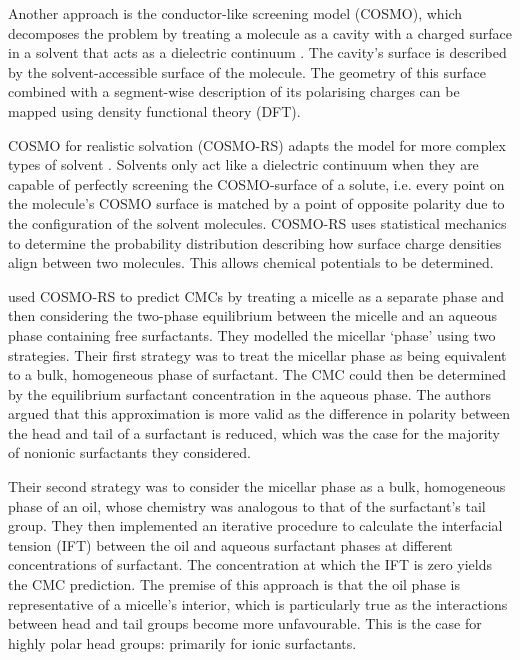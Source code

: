 Another approach is the conductor-like screening model (COSMO), which decomposes
the problem by treating a molecule as a cavity with a charged surface in a
solvent that acts as a dielectric continuum \cite{klamtCOSMONewApproach1993}.
The cavity's surface is described by the solvent-accessible surface of the
molecule. The geometry of this surface combined with a segment-wise description
of its polarising charges can be mapped using density functional theory (DFT).

COSMO for realistic solvation (COSMO-RS) adapts the model for more complex types
of solvent \cite{klamtCOSMORSAlternativeSimulation2010}. Solvents only act like
a dielectric continuum when they are capable of perfectly screening the
COSMO-surface of a solute, i.e. every point on the molecule's COSMO surface is
matched by a point of opposite polarity due to the configuration of the solvent
molecules. COSMO-RS uses statistical mechanics to determine the probability
distribution describing how surface charge densities align between two
molecules. This allows chemical potentials to be determined.

\citet{turchiFirstprinciplesPredictionCritical2022} used COSMO-RS to predict
CMCs by treating a micelle as a separate phase and then considering the
two-phase equilibrium between the micelle and an aqueous phase containing free
surfactants. They modelled the micellar `phase' using two strategies. Their
first strategy was to treat the micellar phase as being equivalent to a bulk,
homogeneous phase of surfactant. The CMC could then be determined by the
equilibrium surfactant concentration in the aqueous phase. The authors argued
that this approximation is more valid as the difference in polarity between the
head and tail of a surfactant is reduced, which was the case for the majority of
nonionic surfactants they considered.

Their second strategy was to consider the micellar phase as a bulk, homogeneous
phase of an oil, whose chemistry was analogous to that of the surfactant's tail
group. They then implemented an iterative procedure to calculate the interfacial
tension (IFT) between the oil and aqueous surfactant phases at different
concentrations of surfactant. The concentration at which the IFT is zero yields
the CMC prediction. The premise of this approach is that the oil phase is
representative of a micelle's interior, which is particularly true as the
interactions between head and tail groups become more unfavourable. This is the
case for highly polar head groups: primarily for ionic surfactants.

